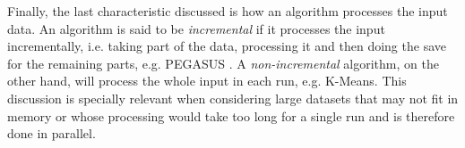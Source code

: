 Finally, the last characteristic discussed is how an algorithm processes the input data.
An algorithm is said to be \emph{incremental} if it processes the input incrementally, i.e. taking part of the data, processing it and then doing the save for the remaining parts, e.g. PEGASUS \cite{Kang2011}.
A \emph{non-incremental} algorithm, on the other hand, will process the whole input in each run, e.g. K-Means.
This discussion is specially relevant when considering large datasets that may not fit in memory or whose processing would take too long for a single run and is therefore done in parallel.








